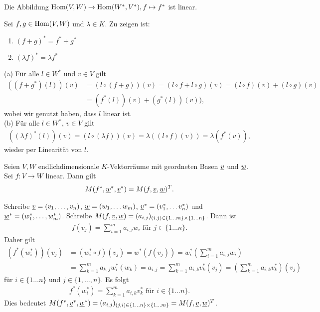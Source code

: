 \documentclass[../../main.tex]{subfiles}
\begin{document}
\begin{pro}\label{13.1.10}
Die Abbildung $\operatorname{Hom}(V,W)\to \operatorname{Hom}(W^*,V^*), f\mapsto f^*$ ist linear.
\end{pro}
\begin{cproof}
Sei $f,g\in \operatorname{Hom}(V,W)$ und $\lambda\in K$. Zu zeigen ist:
\begin{enumerate}[\normalfont(a)]
\item $(f+g)^*=f^*+g^*$
\item $(\lambda f)^*=\lambda f^*$
\end{enumerate}
(a) Für alle $l\in W^*$ und $v\in V$ gilt
\begin{align*}
((f+g^*)(l))(v)&=(l\circ (f+g))(v)=(l\circ f+l\circ g)(v)=(l\circ f)(v)+(l\circ g)(v)\\
&=(f^*(l))(v)+(g^*(l))(v)),
\end{align*}
wobei wir genutzt haben, dass $l$ linear ist.\\
	
\noindent(b) Für alle $l\in W^*$, $v\in V$ gilt
\begin{align*}
((\lambda f)^*(l))(v)=(l\circ (\lambda f))(v)=\lambda((l\circ f)(v))=\lambda(f^*(v)),
\end{align*}
wieder per Linearität von $l$.
\end{cproof}

\begin{pro}\label{13.1.11}
Seien $V,W$ endlichdimensionale $K$-Vektorräume mit geordneten Basen ${\underline v}$ und ${\underline w}$. Sei $f: V\to W$ linear. Dann gilt
\begin{align*}
M(f^*,{\underline w}^*,{\underline v}^*)=M(f,{\underline v},{\underline w})^T.
\end{align*}
\end{pro}
\begin{cproof}
Schreibe ${\underline v}=(v_1,\ldots ,v_n)$, ${\underline w}=(w_1,\ldots w_m)$, ${\underline v}^*=(v_1^*,\ldots v_n^*)$ und ${\underline w}^*=(w_1^*,\ldots ,w_m^*)$. Schreibe $M(f,{\underline v},{\underline w})=(a_{i,j})_{(i,j)\in \{1\ldots m\}\times\{1\ldots n\}}$. Dann ist
\begin{align*}
f(v_j)=\sum^m_{i=1}a_{i,j}w_i \text{ für } j\in\{1\ldots n\}.
\end{align*}
Daher gilt
\begin{align*}
(f^*(w_i^*))(v_j)&=(w_i^*\circ f)(v_j)=w^*(f(v_j))=w^*_i\left(\sum^m_{i=1}a_{i,j}w_i \right)\\
&=\sum^m_{k=1}a_{k,j}w_i^*(w_k)=a_{i,j}=\sum^m_{k=1}a_{i,k}v_k^*(v_j)=\left(\sum^m_{k=1}a_{i,k}v_k^*\right)(v_j)
\end{align*}
für $i\in\{1\ldots n\}$ und $j\in\{1,\ldots ,n\}$. Es folgt
\begin{align*}
f^*(w_i^*)=\sum^m_{k=1}a_{i,k}v_k^*\text{ für }i\in\{1\ldots n\}.
\end{align*}
Dies bedeutet $M(f^*,{\underline v}^*,{\underline w}^*)=(a_{i,j})_{(j,i)\in \{1\ldots n\}\times\{1\ldots m\}}=M(f,\underline{v},\underline{w})^T$.
\end{cproof}
	
\end{document}
